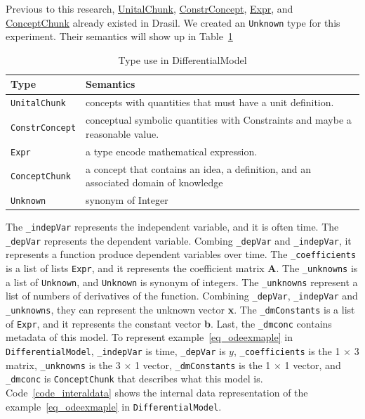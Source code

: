 Previous to this research, \href{https://jacquescarette.github.io/Drasil/docs/full/drasil-lang-0.1.60.0/Language-Drasil-Chunk-Unital.html#t:UnitalChunk}{UnitalChunk}, \href{https://jacquescarette.github.io/Drasil/docs/full/drasil-lang-0.1.60.0/Language-Drasil-Chunk-Constrained.html#t:ConstrConcept}{ConstrConcept}, \href{https://jacquescarette.github.io/Drasil/docs/full/drasil-lang-0.1.60.0/Language-Drasil-Expr-Lang.html#t:Expr}{Expr}, and \href{https://jacquescarette.github.io/Drasil/docs/full/drasil-lang-0.1.60.0/Language-Drasil-Chunk-Concept-Core.html#t:ConceptChunk}{ConceptChunk} already existed in Drasil. We created an \verb|Unknown| type for this experiment. Their semantics will show up in Table~\ref{tab_demodeltype}
\begin{table}[ht]
	\begin{tabular}{ p{} p{} }
		\textbf{Type} & \textbf{Semantics} \\
		\toprule
		\verb|UnitalChunk| & concepts with quantities that must have a unit definition.\\
		\verb|ConstrConcept| & conceptual symbolic quantities with Constraints and maybe a reasonable value.\\
		\verb|Expr| & a type encode mathematical expression. \\
		\verb|ConceptChunk| & a concept that contains an idea, a definition, and an associated domain of knowledge\\
        \verb|Unknown|& synonym of Integer\\
		\bottomrule	
	\end{tabular}	
	\caption{Type use in DifferentialModel}	
	\label{tab_demodeltype}
\end{table}

The \verb|_indepVar| represents the independent variable, and it is often time. The \verb|_depVar| represents the dependent variable. Combing \verb|_depVar| and \verb|_indepVar|, it represents a function produce dependent variables over time. The \verb|_coefficients| is a list of lists \verb|Expr|, and it represents the coefficient matrix \textbf{A}. The \verb|_unknowns| is a list of \verb|Unknown|, and \verb|Unknown| is synonym of integers.
The \verb|_unknowns| represent a list of numbers of derivatives of the function. Combining \verb|_depVar|, \verb|_indepVar| and \verb|_unknowns|, they can represent the unknown vector \textbf{x}. The \verb|_dmConstants| is a list of \verb|Expr|, and it represents the constant vector \textbf{b}. Last, the \verb|_dmconc| contains metadata of this model. To represent example~\ref{eq_odeexmaple} in \verb|DifferentialModel|, \verb|_indepVar| is time, \verb|_depVar| is $y$, \verb|_coefficients| is the 1 $\times$ 3 matrix, \verb|_unknowns| is the 3 $\times$ 1 vector, \verb|_dmConstants| is the 1 $\times$ 1 vector, and \verb|_dmconc| is \verb|ConceptChunk| that describes what this model is. Code~\ref{code_interaldata} shows the internal data representation of the example~\ref{eq_odeexmaple} in \verb|DifferentialModel|.


